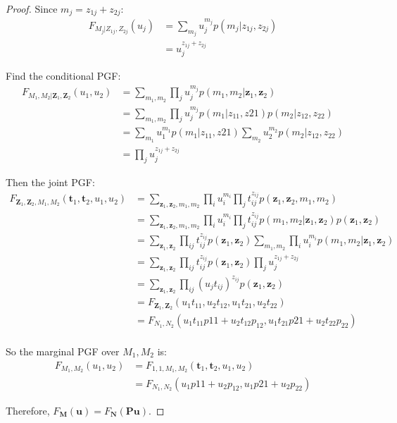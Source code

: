 \documentclass{article}
\begin{document}
\begin{proof}
Since $m_j = z_{1j} + z_{2j}$:
\begin{align*}
F_{M_j|Z_{1j}, Z_{2j}}(u_j) &= \sum_{m_j} u_j^{m_j} p(m_j|z_{1j}, z_{2j}) \\
&= u_j^{z_{1j} + z_{2j}}
\end{align*}

Find the conditional PGF:
\begin{align*}
F_{M_1, M_2 | \mathbf{Z}_1, \mathbf{Z}_2}(u_1, u_2)
&= \sum_{m_1, m_2} \prod_{j} u_{j}^{m_{j}} p(m_1, m_2|\mathbf{z}_1, \mathbf{z}_2) \\
&= \sum_{m_1, m_2} \prod_{j} u_{j}^{m_{j}} p(m_1|z_{11}, z{21}) p(m_2|z_{12}, z_{22}) \\
&= \sum_{m_1} u_1^{m_1} p(m_1|z_{11}, z{21}) \sum_{m_2} u_2^{m_2} p(m_2|z_{12}, z_{22}) \\
&= \prod_j u_j^{z_{1j} + z_{2j}}
\end{align*}

Then the joint PGF:
\begin{align*}
F_{\mathbf{Z}_1, \mathbf{Z}_2, M_1, M_2}(\mathbf{t}_1, \mathbf{t}_2, u_1, u_2)
&= \sum_{\mathbf{z}_1, \mathbf{z}_2, m_1, m_2} \prod_i u_i^{m_i} \prod_j t_{ij}^{z_{ij}} p(\mathbf{z}_1, \mathbf{z}_2, m_1, m_2) \\
&= \sum_{\mathbf{z}_1, \mathbf{z}_2, m_1, m_2} \prod_i u_i^{m_i} \prod_j t_{ij}^{z_{ij}} p(m_1, m_2|\mathbf{z}_1, \mathbf{z}_2) p(\mathbf{z}_1, \mathbf{z}_2) \\
&= \sum_{\mathbf{z}_1, \mathbf{z}_2} \prod_{ij} t_{ij}^{z_{ij}} p(\mathbf{z}_1, \mathbf{z}_2) \sum_{m_1, m_2} \prod_i u_i^{m_i} p(m_1, m_2|\mathbf{z}_1, \mathbf{z}_2) \\
&= \sum_{\mathbf{z}_1, \mathbf{z}_2} \prod_{ij} t_{ij}^{z_{ij}} p(\mathbf{z}_1, \mathbf{z}_2) \prod_j u_j^{z_{1j} + z_{2j}} \\
&= \sum_{\mathbf{z}_1, \mathbf{z}_2} \prod_{ij} (u_j t_{ij})^{z_{ij}} p(\mathbf{z}_1, \mathbf{z}_2) \\
&= F_{\mathbf{Z}_1, \mathbf{Z}_2}(u_1 t_{11}, u_2 t_{12}, u_1 t_{21}, u_2 t_{22}) \\
&= F_{N_1, N_2}(u_1 t_{11} p{11} + u_2 t_{12} p_{12}, u_1 t_{21} p{21} + u_2 t_{22} p_{22}) \\
\end{align*}

So the marginal PGF over $M_1, M_2$ is:
\begin{align*}
F_{M_1, M_2}(u_1, u_2) &= F_{1, 1, M_1, M_2}(\mathbf{t}_1, \mathbf{t}_2, u_1, u_2) \\
&= F_{N_1, N_2}(u_1 p{11} + u_2 p_{12}, u_1 p{21} + u_2 p_{22})
\end{align*}

Therefore, $F_{\mathbf{M}}(\mathbf{u}) = F_{\mathbf{N}}(\mathbf{Pu})$.

\end{proof}
\end{document}
